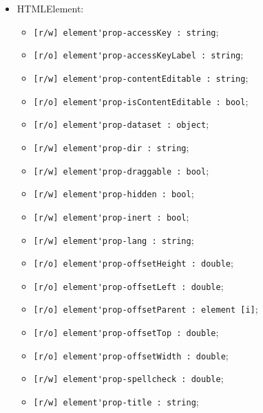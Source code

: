 \documentclass[a4paper, 14pt]{extarticle}
\newenvironment{icItems}
	{ \begin{itemize} [noitemsep,nolistsep] }
	{ \end{itemize} }
\begin{document}
\begin{icItems}
	\item HTMLElement:
	\begin{icItems}
		\item \lstinline|[r/w] element'prop-accessKey : string|;
		\item \lstinline|[r/o] element'prop-accessKeyLabel : string|;
		\item \lstinline|[r/w] element'prop-contentEditable : string|;
		\item \lstinline|[r/o] element'prop-isContentEditable : bool|;
		\item \lstinline|[r/o] element'prop-dataset : object|;
		\item \lstinline|[r/w] element'prop-dir : string|;
		\item \lstinline|[r/w] element'prop-draggable : bool|;
		\item \lstinline|[r/w] element'prop-hidden : bool|;
		\item \lstinline|[r/w] element'prop-inert : bool|;
		\item \lstinline|[r/w] element'prop-lang : string|;
		\item \lstinline|[r/o] element'prop-offsetHeight : double|;
		\item \lstinline|[r/o] element'prop-offsetLeft : double|;
		\item \lstinline|[r/o] element'prop-offsetParent : element [i]|;
		\item \lstinline|[r/o] element'prop-offsetTop : double|;
		\item \lstinline|[r/o] element'prop-offsetWidth : double|;
		\item \lstinline|[r/w] element'prop-spellcheck : double|;
		\item \lstinline|[r/w] element'prop-title : string|;
	\end{icItems}
	

\end{icItems}
\end{document}
